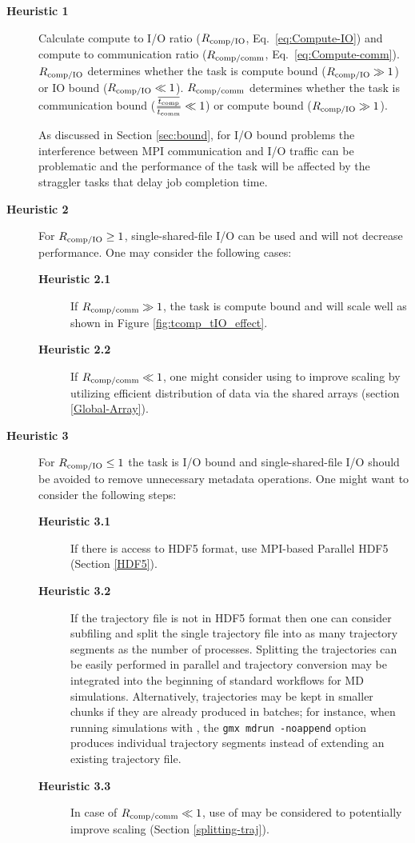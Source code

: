 \begin{description}
\item[\textbf{Heuristic 1}] Calculate compute to I/O ratio ($R_{\text{comp/IO}}$, Eq.~\ref{eq:Compute-IO}) and compute to communication ratio ($R_{\text{comp/comm}}$, Eq.~\ref{eq:Compute-comm}).
  $R_{\text{comp/IO}}$ determines whether the task is compute bound ($R_{\text{comp/IO}} \gg 1$) or IO bound ($R_{\text{comp/IO}} \ll 1$).
  $R_{\text{comp/comm}}$ determines whether the task is communication bound ($\frac{\overline{{t}_{\text{comp}}}}{\overline{t_{\text{comm}}}} \ll 1$) or compute bound ($R_{\text{comp/IO}} \gg 1$).

  As discussed in Section \ref{sec:bound}, for I/O bound problems the interference between MPI communication and I/O traffic can be problematic \cite{VMD2013, Brown:2018ab} and the performance of the task will be affected by the straggler tasks that delay job completion time.
  
\item[\textbf{Heuristic 2}] For $R_{\text{comp/IO}} \ge 1$, single-shared-file I/O can be used and will not decrease performance. One may consider the following cases: 
  \begin{description}
  \item[\textbf{Heuristic 2.1}] If $R_{\text{comp/comm}} \gg 1$, the task is compute bound and will scale well as shown in Figure \ref{fig:tcomp_tIO_effect}. 
  \item[\textbf{Heuristic 2.2}] If $R_{\text{comp/comm}} \ll 1$, one might consider using  to improve scaling by utilizing efficient distribution of data via the shared arrays (section \ref{Global-Array}).
  \end{description}
\item[\textbf{Heuristic 3}] For $R_{\text{comp/IO}} \le 1$ the task is I/O bound and single-shared-file I/O should be avoided to remove unnecessary metadata operations.
  One might want to consider the following steps:  
  \begin{description}
    \item[\textbf{Heuristic 3.1}] If there is access to HDF5 format, use MPI-based Parallel HDF5 (Section \ref{HDF5}). 
    \item[\textbf{Heuristic 3.2}] If the trajectory file is not in HDF5 format then one can consider subfiling and split the single trajectory file into as many trajectory segments as the number of processes.
      Splitting the trajectories can be easily performed in parallel and trajectory conversion may be integrated into the beginning of standard workflows for MD simulations.
      Alternatively, trajectories may be kept in smaller chunks if they are already produced in batches; for instance, when running simulations with  \cite{Abraham:2015aa}, the \texttt{gmx mdrun -noappend} option produces individual trajectory segments instead of extending an existing trajectory file.
    \item[\textbf{Heuristic 3.3}] In case of $R_{\text{comp/comm}} \ll 1$, use of  may be considered to potentially improve scaling (Section \ref{splitting-traj}).
  \end{description}
\end{description}
